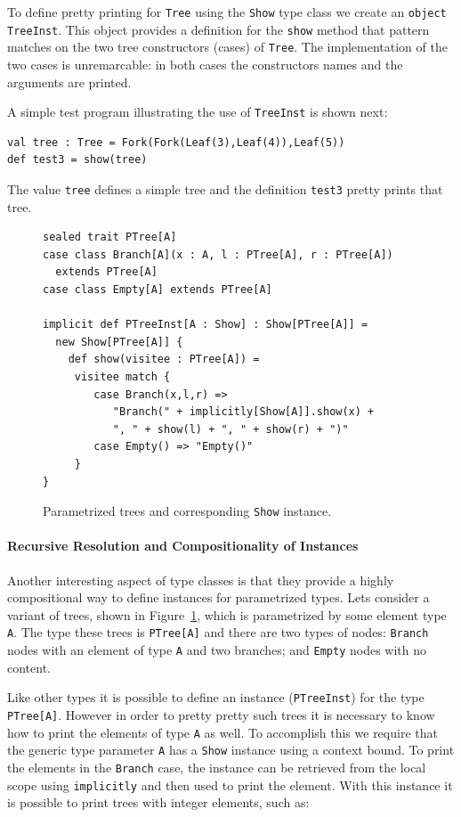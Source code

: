 \documentclass[preprint]{sigplanconf}
\begin{document}
To define pretty printing for \lstinline{Tree} using the
\lstinline{Show} type class we create an \lstinline{object TreeInst}.
This object provides a definition for the
\lstinline{show} method that pattern matches on the
two tree constructors (cases) of \lstinline{Tree}. The implementation
of the two cases is unremarcable: in both cases the
constructors names and the arguments are printed.

A simple test program illustrating the use of \lstinline{TreeInst}
is shown next:

\begin{lstlisting}
val tree : Tree = Fork(Fork(Leaf(3),Leaf(4)),Leaf(5))
def test3 = show(tree)
\end{lstlisting}

\noindent The value \lstinline{tree} defines a simple tree and the
definition \lstinline{test3} pretty prints that tree.

\begin{figure}
\begin{lstlisting}
sealed trait PTree[A]
case class Branch[A](x : A, l : PTree[A], r : PTree[A])
  extends PTree[A]
case class Empty[A] extends PTree[A]

implicit def PTreeInst[A : Show] : Show[PTree[A]] =
  new Show[PTree[A]] {
    def show(visitee : PTree[A]) =
     visitee match {
        case Branch(x,l,r) =>
           "Branch(" + implicitly[Show[A]].show(x) +
           ", " + show(l) + ", " + show(r) + ")"
   	    case Empty() => "Empty()"
     }
}
\end{lstlisting}
\caption{Parametrized trees and corresponding \lstinline{Show}
  instance.}
\label{fig:ptrees}
\end{figure}

\paragraph{Recursive Resolution and Compositionality of Instances}
Another interesting aspect of type classes is that they provide a
highly compositional way to define instances for parametrized types.
Lets consider a variant of trees, shown in Figure~\ref{fig:ptrees}, which is
parametrized by some element type \lstinline{A}. The type these trees
is \lstinline{PTree[A]} and there are two types of nodes:
\lstinline{Branch} nodes with an element of type \lstinline{A}
and two branches; and \lstinline{Empty} nodes with no content.

Like other types it is possible to define an instance (\lstinline{PTreeInst})
for the type \lstinline{PTree[A]}. However in order to pretty pretty
such trees it is necessary to know how to print the elements of type
\lstinline{A} as well. To accomplish this we require that the
generic type parameter \lstinline{A} has a \lstinline{Show} instance
using a context bound.  To print the elements in the
\lstinline{Branch} case, the instance can be retrieved from the local
scope using \lstinline{implicitly} and then used to print the element.
With this instance it is possible to print trees with integer elements, such as:
\end{document}
